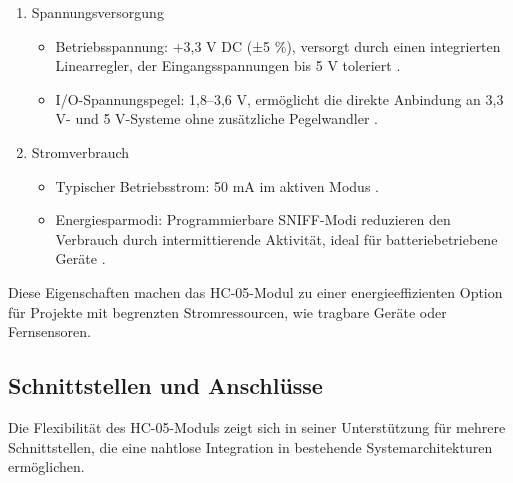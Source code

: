 \begin{enumerate}
    \item Spannungsversorgung 
    \begin{itemize}
        \item Betriebsspannung: +3,3 V DC (±5 \%), versorgt durch einen integrierten Linearregler, der Eingangsspannungen bis 5 V toleriert \cite{ReicheltHC05:2025}.
        \item I/O-Spannungspegel: 1,8–3,6 V, ermöglicht die direkte Anbindung an 3,3 V- und 5 V-Systeme ohne zusätzliche Pegelwandler \cite{HC05Datasheet:2010}.
    \end{itemize}
    
    \item Stromverbrauch 
    
    \begin{itemize}
        \item Typischer Betriebsstrom: 50 mA im aktiven Modus \cite{ReicheltHC05:2025}.
        \item Energiesparmodi: Programmierbare SNIFF-Modi reduzieren den Verbrauch durch intermittierende Aktivität, ideal für batteriebetriebene Geräte \cite{HC05Datasheet:2010}.
    \end{itemize}
\end{enumerate}

Diese Eigenschaften machen das HC-05-Modul zu einer energieeffizienten Option für Projekte mit begrenzten Stromressourcen, wie tragbare Geräte oder Fernsensoren.




\subsection{Schnittstellen und Anschlüsse}

Die Flexibilität des HC-05-Moduls zeigt sich in seiner Unterstützung für mehrere Schnittstellen, die eine nahtlose Integration in bestehende Systemarchitekturen ermöglichen.

